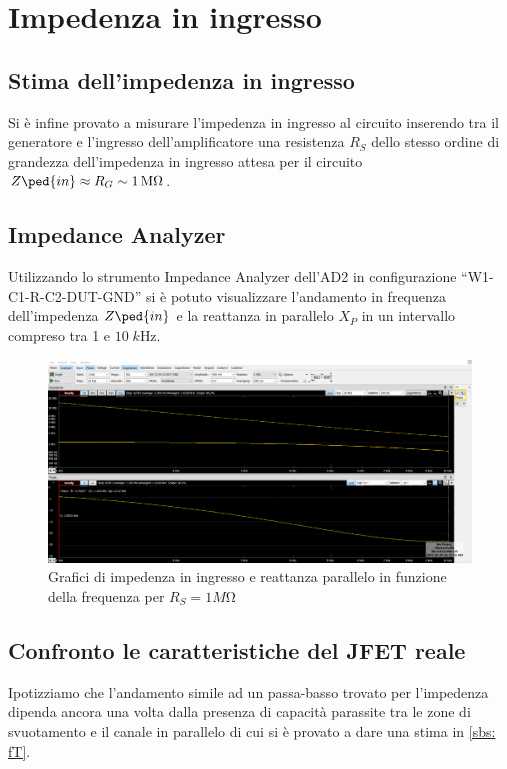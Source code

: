 \documentclass[10pt, a4paper, italian]{article}
\begin{document}
\section{Impedenza in ingresso}
\subsection{Stima dell'impedenza in ingresso}
Si è infine provato a misurare l'impedenza in ingresso al circuito inserendo
tra il generatore e l'ingresso dell'amplificatore una resistenza $R_S$ dello
stesso ordine di grandezza dell'impedenza in ingresso attesa per il circuito
$Z\ped{in} \approx R_G \sim \SI{1}{M\ohm}$.

\subsection{Impedance Analyzer}
Utilizzando lo strumento Impedance Analyzer dell'AD2 in configurazione
``W1-C1-R-C2-DUT-GND'' si è potuto visualizzare l'andamento in frequenza
dell'impedenza $Z\ped{in}$ e la reattanza in parallelo $X_P$ in un intervallo
compreso tra 1 e $10 \; \si{k\Hz}$.
\begin{figure}[htbp]
    \centering
	\includegraphics[width=\textwidth]{amp}
    \caption{Grafici di impedenza in ingresso e reattanza parallelo in
    funzione della frequenza per $R_S = 1 \si{M\ohm}$}
\end{figure}

\subsection{Confronto le caratteristiche del JFET reale}
Ipotizziamo che l'andamento simile ad un passa-basso trovato per l'impedenza
dipenda ancora una volta dalla presenza di capacità parassite tra le zone di
svuotamento e il canale in parallelo di cui si è provato a dare una stima in
\cref{sbs: fT}.
\end{document}
